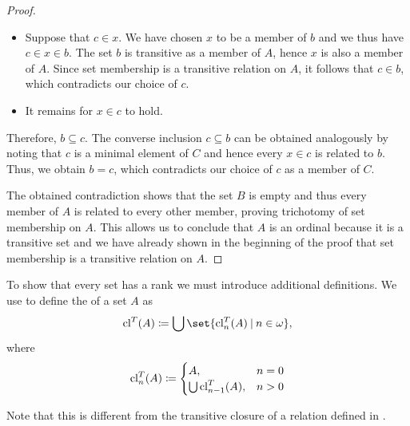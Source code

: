 \begin{proof}
\begin{itemize}
    \item Suppose that \( c \in x \). We have chosen \( x \) to be a member of \( b \) and we thus have \( c \in x \in b \). The set \( b \) is transitive as a member of \( A \), hence \( x \) is also a member of \( A \). Since set membership is a transitive relation on \( A \), it follows that \( c \in b \), which contradicts our choice of \( c \).

    \item It remains for \( x \in c \) to hold.
  \end{itemize}

  Therefore, \( b \subseteq c \). The converse inclusion \( c \subseteq b \) can be obtained analogously by noting that \( c \) is a minimal element of \( C \) and hence every \( x \in c \) is related to \( b \). Thus, we obtain \( b = c \), which contradicts our choice of \( c \) as a member of \( C \).

  The obtained contradiction shows that the set \( B \) is empty and thus every member of \( A \) is related to every other member, proving trichotomy of set membership on \( A \). This allows us to conclude that \( A \) is an ordinal because it is a transitive set and we have already shown in the beginning of the proof that set membership is a transitive relation on \( A \).
\end{proof}

\begin{definition}\label{def:transitive_closure_of_a_set}
  To show that every set has a rank we must introduce additional definitions. We use  to define the  of a set \( A \) as
  \begin{equation*}
    \cl^T(A) \coloneqq \bigcup \set{ \cl_n^T(A) \given n \in \omega },
  \end{equation*}
  where
  \begin{equation*}
    \operatorname{cl}_n^T(A) \coloneqq \begin{cases}
      A,                      &n = 0 \\
      \bigcup \operatorname{cl}_{n-1}^T(A), &n > 0
    \end{cases}
  \end{equation*}

  Note that this is different from the transitive closure of a relation defined in .
\end{definition}

